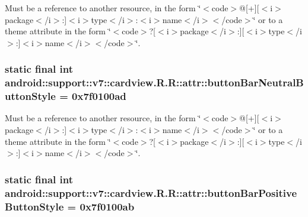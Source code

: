 Must be a reference to another resource, in the form \char`\"{}$<$code$>$@\mbox{[}+\mbox{]}\mbox{[}$<$i$>$package$<$/i$>$:\mbox{]}$<$i$>$type$<$/i$>$:$<$i$>$name$<$/i$>$$<$/code$>$\char`\"{} or to a theme attribute in the form \char`\"{}$<$code$>$?\mbox{[}$<$i$>$package$<$/i$>$:\mbox{]}\mbox{[}$<$i$>$type$<$/i$>$:\mbox{]}$<$i$>$name$<$/i$>$$<$/code$>$\char`\"{}. \hypertarget{classandroid_1_1support_1_1v7_1_1cardview_1_1_r_1_1attr_27877b15641d7486696f30726a03f1a9}{
\subsubsection[{buttonBarNeutralButtonStyle}]{\setlength{\rightskip}{0pt plus 5cm}static final int android::support::v7::cardview.R.R::attr::buttonBarNeutralButtonStyle = 0x7f0100ad}}
\label{classandroid_1_1support_1_1v7_1_1cardview_1_1_r_1_1attr_27877b15641d7486696f30726a03f1a9}


Must be a reference to another resource, in the form \char`\"{}$<$code$>$@\mbox{[}+\mbox{]}\mbox{[}$<$i$>$package$<$/i$>$:\mbox{]}$<$i$>$type$<$/i$>$:$<$i$>$name$<$/i$>$$<$/code$>$\char`\"{} or to a theme attribute in the form \char`\"{}$<$code$>$?\mbox{[}$<$i$>$package$<$/i$>$:\mbox{]}\mbox{[}$<$i$>$type$<$/i$>$:\mbox{]}$<$i$>$name$<$/i$>$$<$/code$>$\char`\"{}. \hypertarget{classandroid_1_1support_1_1v7_1_1cardview_1_1_r_1_1attr_2d7dc301195220ad4f46b80d53244f60}{
\subsubsection[{buttonBarPositiveButtonStyle}]{\setlength{\rightskip}{0pt plus 5cm}static final int android::support::v7::cardview.R.R::attr::buttonBarPositiveButtonStyle = 0x7f0100ab}}
\label{classandroid_1_1support_1_1v7_1_1cardview_1_1_r_1_1attr_2d7dc301195220ad4f46b80d53244f60}


